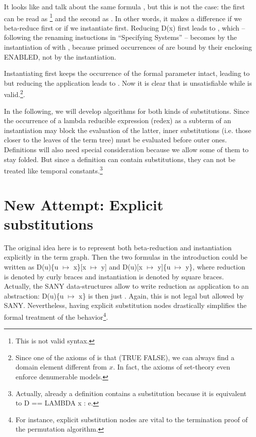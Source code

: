 \documentclass[a4paper]{article}
\theoremstyle{definition}
\begin{document}
\vspace{2mm}
\noindent
It looks like  and  talk about the same formula ,
but this is not the case: the first can be read as \footnote{This
  is not valid \tlaplus{} syntax.} and the second as . In other
words, it makes a difference if we beta-reduce first or if we instantiate
first. Reducing D(x) first leads to , which --
following the renaming instuctions in ``Specifying Systems'' -- becomes
 by the instantiation of  with ,
because primed occurrences of  are bound by their enclosing ENABLED,
not by the instantiation.

Instantiating first keeps the occurrence of the  formal parameter  intact,
leading to  but reducing the application
 leads to . Now it is clear that
 is unsatisfiable while  is valid.\footnote{ Since
  one of the axioms  of \tlaplus{} is that (TRUE \dif FALSE), we can always find
  a domain element different from $x$. In fact, the axioms of set-theory even
  enforce denumerable models.}.

In the following, we will develop algorithms for both kinds of substitutions.
Since the occurrence of a lambda reducible expression (redex) as a subterm of
an instantiation may block the evaluation of the latter, inner substitutions
(i.e. those closer to the leaves of the term tree) must be evaluated before
outer ones. Definitions will also need special consideration because
we allow some of them to stay folded. But since a definition can contain
substitutions, they can not be treated like temporal constants.\footnote{
  Actually, already a definition  contains a substitution
  because it is equivalent to D == LAMBDA x : e.
}

\section{New Attempt: Explicit substitutions}

The original idea here is to represent both beta-reduction and instantiation
explicitly in the term graph. Then the two formulas in the introduction
could be written as D(u)\{u $\mapsto$ x\}[x $\mapsto$ y] and
D(u)[x $\mapsto$ y]\{u $\mapsto$ y\}, where reduction is denoted by curly
braces and instantiation is denoted by square braces. Actually, the SANY
data-structures allow to write reduction as application to an abstraction:
D(u)\{u $\mapsto$ x\} is then just . Again, this
is not legal \tlaplus{} but allowed by SANY. Nevertheless, having explicit
substitution nodes drastically simplifies the formal treatment of the
behavior\footnote{For instance, explicit substitution nodes are vital to the
  termination proof of the permutation algorithm.
}.
\end{document}

